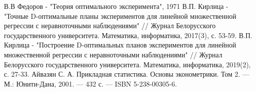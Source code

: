 \begin{thebibliography}{}
	 В.В Федоров - "Теория оптимального эксперимента", 1971
	 В.П. Кирлица - "Точные  D-оптимальные планы экспериментов для линейной множественной регрессии с неравноточными наблюдениями" // Журнал Белорусского государственного университета. Математика, информатика, 2017(3), с. 53-59.
	 В.П. Кирлица - "Построение  D-оптимальных  планов экспериментов для линейной множественной регрессии с неравноточными наблюдениями" // Журнал Белорусского государственного университета. Математика, информатика, 2019(2), с. 27-33.
	 Айвазян С. А. Прикладная статистика. Основы эконометрики. Том 2. — М.: Юнити-Дана, 2001. — 432 с. — ISBN 5-238-00305-6.
\end{thebibliography}

